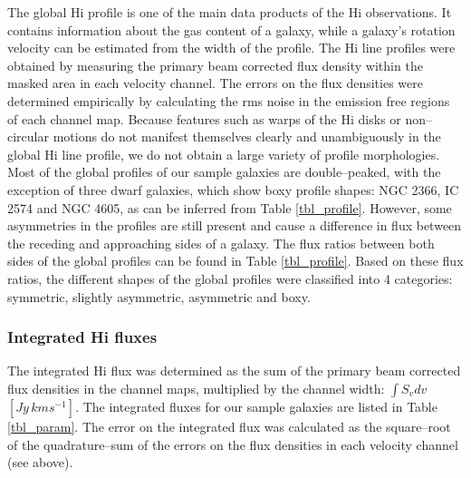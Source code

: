 \documentclass[usenatbib,useAMS]{mnras}
\begin{document}
The global H{\sc i} profile is one of the main data products of the
H{\sc i} observations.  It contains information about the gas content of
a galaxy, while a galaxy's rotation velocity can be estimated from the
width of the profile.  The H{\sc i} line profiles were obtained by
measuring the primary beam corrected flux density within the masked area
in each velocity channel.  The errors on the flux densities were
determined empirically by calculating the rms noise in the emission free
regions of each channel map. Because features such as warps of the
H{\sc i} disks or non--circular motions do not manifest themselves
clearly and unambiguously in the global H{\sc i} line profile, we do
not obtain a large variety of profile morphologies.  Most of the global
profiles of our sample galaxies are double--peaked, with the exception
of three dwarf galaxies, which show boxy profile shapes: NGC 2366,
IC 2574 and NGC 4605, as can be inferred from Table \ref{tbl_profile}. 
However, some asymmetries in the profiles are still present and cause a
difference in flux between the receding and approaching sides of a
galaxy.  The flux ratios between both sides of the global profiles can
be found in Table \ref{tbl_profile}.  Based on these flux ratios, the
different shapes of the global profiles were classified into 4
categories: symmetric, slightly asymmetric, asymmetric and boxy. 

\subsubsection{Integrated H{\sc i} fluxes}

The integrated H{\sc i} flux was determined as the sum of the primary
beam corrected flux densities in the channel maps, multiplied by the
channel width: $\int S_{v}dv$ \, $[Jy \, kms^{-1}]$.  The integrated
fluxes for our sample galaxies are listed in Table \ref{tbl_param}. 
The error on the integrated flux was calculated as the square--root
of the quadrature--sum of the errors on the flux densities in each
velocity channel (see above).
\end{document}
